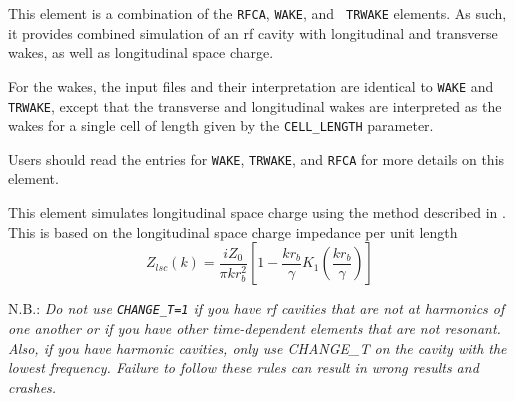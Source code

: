 This element is a combination of the {\tt RFCA}, {\tt WAKE}, and {\tt
TRWAKE} elements.  As such, it provides combined simulation of an rf
cavity with longitudinal and transverse wakes, as well as longitudinal
space charge.

For the wakes, the input files and their interpretation are identical
to {\tt WAKE} and {\tt TRWAKE}, except that the transverse and
longitudinal wakes are interpreted as the wakes for a single cell of
length given by the {\tt CELL\_LENGTH} parameter.

Users should read the entries for {\tt WAKE}, {\tt TRWAKE}, and {\tt RFCA}
for more details on this element.

This element simulates longitudinal space charge using the
method described in \cite{Huang2004}.  This is based on the 
longitudinal space charge impedance per unit length
\begin{equation}
  Z_{lsc}(k) = \frac{i Z_0}{\pi k r_b^2} \left[ 1 - \frac{kr_b}{\gamma}K_1 \left(\frac{kr_b}{\gamma}\right)\right]
\end{equation}

N.B.: {\em Do not use \verb|CHANGE_T=1| if you have rf cavities that
are not at harmonics of one another or if you have other
time-dependent elements that are not resonant. Also, if you have harmonic
cavities, only use CHANGE_T on the cavity with the lowest frequency.
Failure to follow these rules can result in wrong results and crashes.}
